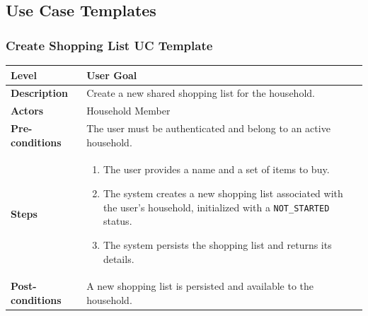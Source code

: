 \subsection{Use Case Templates}

\subsubsection{Create Shopping List UC Template}
\begin{longtable}{|p{3.5cm}|p{10.3cm}|}
\hline
\rowcolor{UCRow} \textbf{Level} & User Goal \\ \hline
\textbf{Description} & Create a new shared shopping list for the household. \\ \hline
\rowcolor{UCRow} \textbf{Actors} & Household Member \\ \hline
\textbf{Pre-conditions} & The user must be authenticated and belong to an active household. \\ \hline
\rowcolor{UCRow} \textbf{Steps} &
\begin{enumerate}[nosep, leftmargin=*]
    \item The user provides a name and a set of items to buy.
    \item The system creates a new shopping list associated with the user's household, initialized with a \texttt{NOT\_STARTED} status.
    \item The system persists the shopping list and returns its details.
\end{enumerate} \\ \hline
\textbf{Post-conditions} & A new shopping list is persisted and available to the household. \\ \hline
\end{longtable}

